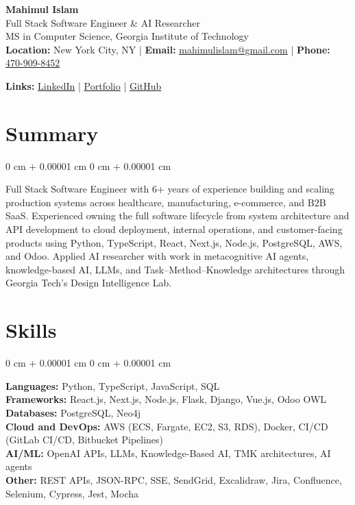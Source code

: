 \documentclass[10pt, letterpaper]{article}
\newenvironment{onecolentry}{
    \begin{adjustwidth}{
        0 cm + 0.00001 cm
    }{
        0 cm + 0.00001 cm
    }
}{
    \end{adjustwidth}
}
\begin{document}
\begin{center}
{\fontsize{25pt}{25pt}\selectfont \textbf{Mahimul Islam}} \\[5pt]
{\fontsize{12pt}{12pt}\selectfont Full Stack Software Engineer \& AI Researcher} \\[5pt]
{\fontsize{11pt}{11pt}\selectfont MS in Computer Science, Georgia Institute of Technology} \\[5pt]

\textbf{Location:} New York City, NY \quad | \quad
\textbf{Email:} \href{mailto:mahimulislam@gmail.com}{mahimulislam@gmail.com} \quad | \quad
\textbf{Phone:} \href{tel:+1-470-909-8452}{470-909-8452}

\textbf{Links:}
\href{https://linkedin.com/in/mahimulislam}{LinkedIn} |
\href{https://mahimulislam.com}{Portfolio} |
\href{https://github.com/mahimulislam}{GitHub}
\end{center}

\section{Summary}

\begin{onecolentry}
Full Stack Software Engineer with 6+ years of experience building and scaling production systems across healthcare, manufacturing, e-commerce, and B2B SaaS. Experienced owning the full software lifecycle from system architecture and API development to cloud deployment, internal operations, and customer-facing products using Python, TypeScript, React, Next.js, Node.js, PostgreSQL, AWS, and Odoo. Applied AI researcher with work in metacognitive AI agents, knowledge-based AI, LLMs, and Task--Method--Knowledge architectures through Georgia Tech's Design Intelligence Lab.
\end{onecolentry}

\section{Skills}

\begin{onecolentry}
\textbf{Languages:} Python, TypeScript, JavaScript, SQL \\[3pt]
\textbf{Frameworks:} React.js, Next.js, Node.js, Flask, Django, Vue.js, Odoo OWL \\[3pt]
\textbf{Databases:} PostgreSQL, Neo4j \\[3pt]
\textbf{Cloud and DevOps:} AWS (ECS, Fargate, EC2, S3, RDS), Docker, CI/CD (GitLab CI/CD, Bitbucket Pipelines) \\[3pt]
\textbf{AI/ML:} OpenAI APIs, LLMs, Knowledge-Based AI, TMK architectures, AI agents \\[3pt]
\textbf{Other:} REST APIs, JSON-RPC, SSE, SendGrid, Excalidraw, Jira, Confluence, Selenium, Cypress, Jest, Mocha
\end{onecolentry}
\end{document}
